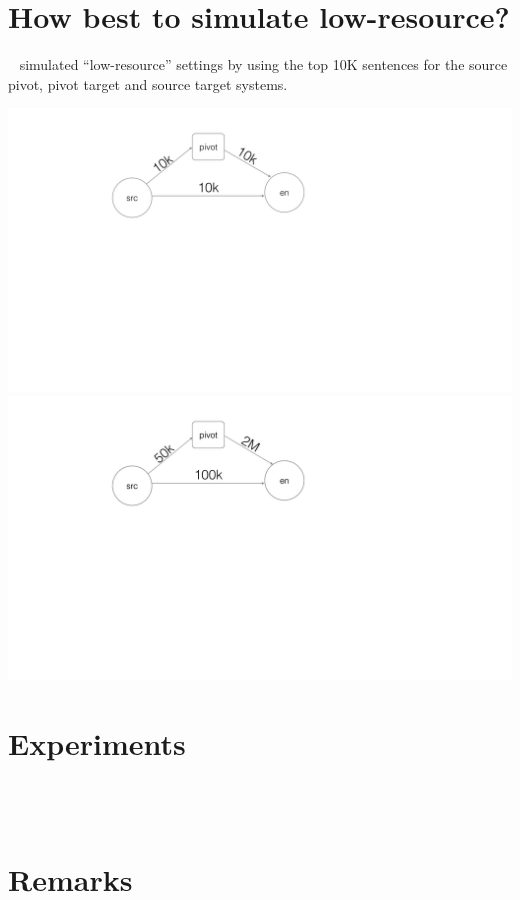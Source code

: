\section{How best to simulate low-resource?}

~\cite{Cohn:07} simulated ``low-resource'' settings by using the top 10K sentences for the source pivot, pivot target and source target systems.  

\includegraphics[scale=0.2]{files/Figures/Cohn.jpg} \\
\includegraphics[scale=0.2]{files/Figures/Our.jpg} \\

\section{Experiments}
 \\
 \\

\section{Remarks}









